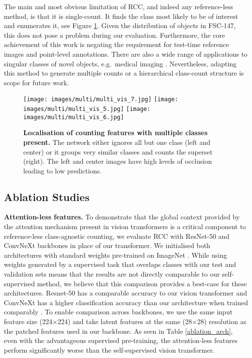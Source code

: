 \documentclass[letterpaper, 11pt]{IEEEtran}
\begin{document}
The main and most obvious limitation of RCC, and indeed any reference-less method, is that it is single-count. It finds the class most likely to be of interest and enumerates it, see Figure \ref{figure_multiclass}. Given the distribution of objects in FSC-147, this does not pose a problem during our evaluation.
Furthermore, the core achievement of this work is negating the requirement for test-time reference images and point-level annotations. There are also a wide range of applications to singular classes of novel objects, e.g.\ medical imaging \cite{xie2018microscopy}.
Nevertheless, adapting this method to generate multiple counts or a hierarchical class-count structure is scope for future work.
\begin{figure}
    \centering
       \texttt{[image: images/multi/multi\_vis\_7.jpg]}
\texttt{[image: images/multi/multi\_vis\_5.jpg]}
\texttt{[image: images/multi/multi\_vis\_6.jpg]}
     \caption{\textbf{Localisation of counting features with multiple classes present.} 
    The network either ignores all but one class (left and center) or it groups very similar classes and counts the superset (right). The left and center images have high levels of occlusion leading to low predictions.
    }
    \label{figure_multiclass}
\end{figure}

\vspace{5mm}
\subsection{Ablation Studies}
\label{results_ablationstudies}

\textbf{Attention-less features.}
To demonstrate that the global context provided by the attention mechanism present in vision transformers is a critical component to reference-less class-agnostic counting, we evaluate RCC with ResNet-50 \cite{he2016resnet} and ConvNeXt \cite{liu2022convnext} backbones in place of our transformer. 
We initialised both architectures with standard weights pre-trained on ImageNet \cite{deng2009imagenet}. 
While using weights generated by a supervised task that overlaps classes with our test and validation sets means that the results are not directly comparable to our self-supervised method, we believe that this comparison provides a best-case for these architectures.
Resnet-50 has a comparable accuracy to our vision transformer and ConvNeXt has a higher classification accuracy than our architecture when trained comparably \cite{liu2022convnext}.
To enable comparison across backbones, we use the same input feature size (224$\times$224) and take latent features at the same (28$\times$28) resolution as the patched features used in our backbone. 
As seen in Table \ref{ablation_arch}, even with the advantageous supervised pre-training, the attention-less features perform significantly worse than the self-supervised vision transformer.
\end{document}
